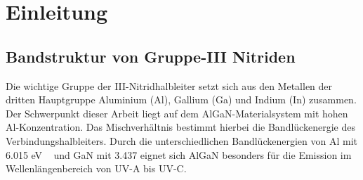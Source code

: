 
\chapter{Einleitung}
\thispagestyle{fancy}

\section{Bandstruktur von Gruppe-III Nitriden}

Die wichtige Gruppe der III-Nitridhalbleiter setzt sich aus den Metallen
der dritten Hauptgruppe Aluminium (Al), Gallium (Ga) und Indium (In) zusammen.
Der Schwerpunkt dieser Arbeit liegt auf dem AlGaN-Materialsystem mit hohen Al-Konzentration.
Das Mischverhältnis bestimmt hierbei die Bandlückenergie des Verbindungshalbleiters. Durch die unterschiedlichen Bandlückenergien von Al mit 6.015 eV ~\cite{fenaln} und GaN mit 3.437 eignet sich AlGaN besonders für die Emission im Wellenlängenbereich von UV-A bis UV-C. 






